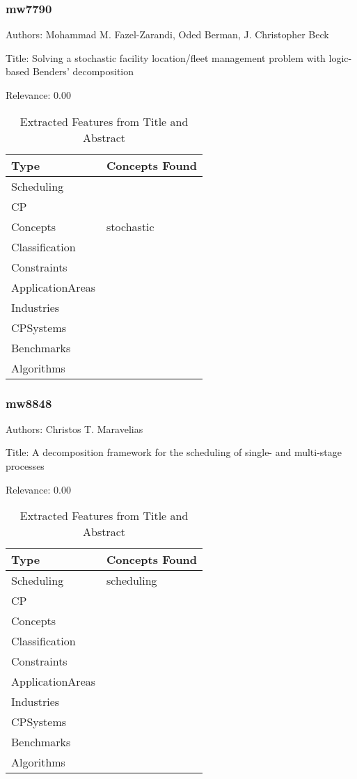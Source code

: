 \subsubsection{mw7790}
\label{mw:mw7790}

Authors: Mohammad M. Fazel-Zarandi, Oded Berman, J. Christopher Beck

Title: Solving a stochastic facility location/fleet management problem with logic-based Benders' decomposition

Relevance:  0.00

{\scriptsize
\begin{longtable}{p{2cm}p{20cm}}
\caption{Extracted Features from Title and Abstract}\\ \toprule
Type & Concepts Found\\ \midrule
\endhead
\bottomrule
\endfoot
Scheduling & \\ 
CP & \\ 
Concepts & stochastic\\ 
Classification & \\ 
Constraints & \\ 
ApplicationAreas & \\ 
Industries & \\ 
CPSystems & \\ 
Benchmarks & \\ 
Algorithms & \\ 
\end{longtable}
}



\subsubsection{mw8848}
\label{mw:mw8848}

Authors: Christos T. Maravelias

Title: A decomposition framework for the scheduling of single- and multi-stage processes

Relevance:  0.00

{\scriptsize
\begin{longtable}{p{2cm}p{20cm}}
\caption{Extracted Features from Title and Abstract}\\ \toprule
Type & Concepts Found\\ \midrule
\endhead
\bottomrule
\endfoot
Scheduling & scheduling\\ 
CP & \\ 
Concepts & \\ 
Classification & \\ 
Constraints & \\ 
ApplicationAreas & \\ 
Industries & \\ 
CPSystems & \\ 
Benchmarks & \\ 
Algorithms & \\ 
\end{longtable}
}



